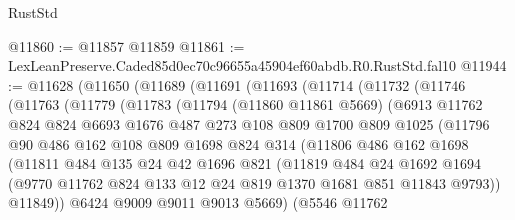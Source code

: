 \begin{lexlean}{RustStd}
\begin{coremodule}
@11860 := @11857 @11859
@11861 := LexLeanPreserve.Caded85d0ec70c96655a45904ef60abdb.R0.RustStd.fal10
@11944 := @11628
    (@11650
      (@11689
        (@11691
          (@11693
            (@11714
              (@11732
                (@11746
                  (@11763
                    (@11779
                      (@11783
                        (@11794
                          (@11860 @11861 @5669)
                          (@6913
                            @11762
                            @824
                            @824
                            @6693
                            @1676
                            @487
                            @273
                            @108
                            @809
                            @1700
                            @809
                            @1025
                            (@11796
                              @90
                              @486
                              @162
                              @108
                              @809
                              @1698
                              @824
                              @314
                              (@11806
                                @486
                                @162
                                @1698
                                (@11811
                                  @484
                                  @135
                                  @24
                                  @42
                                  @1696
                                  @821
                                  (@11819
                                    @484
                                    @24
                                    @1692
                                    @1694
                                    (@9770
                                      @11762
                                      @824
                                      @133
                                      @12
                                      @24
                                      @819
                                      @1370
                                      @1681
                                      @851
                                      @11843
                                      @9793))
                                  @11849))
                              @6424
                              @9009
                              @9011
                              @9013
                              @5669)
                            (@5546
                              @11762

\end{coremodule}
\end{lexlean}
